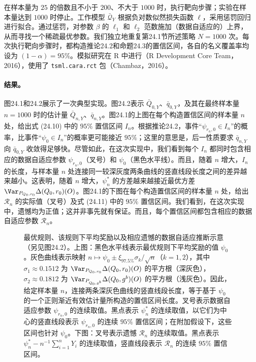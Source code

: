 在样本量为 $25$ 的倍数且不小于 $200$、不大于 $1000$ 时，执行靶向步骤；实验在样本量达到 $1000$ 时停止。工作模型 $\bar{\mathcal Q}_Y$ 根据负对数似然损失函数 $\ell$，采用惩罚回归进行拟合。通过惩罚，对参数 $\beta$ 的 $\ell_1$ 和 $\ell_2$ 范数施加（数据自适应的）上界，从而寻找一个稀疏最优参数。我们独立地重复第24.1节所述策略 $N=1000$ 次。每次执行靶向步骤时，都构造推论24.2和命题24.3的置信区间，各自的名义覆盖率均设为 $(1-\alpha)=95\%$。模拟研究在 R 中进行（R Development Core Team，2016），使用了 \texttt{tsml.cara.rct} 包（Chambaz，2016）。

\paragraph*{结果。}
图24.1和24.2展示了一次典型实现。图24.2表示 $\bar Q_{0,Y}$、$\bar q_{0,Y}$，及其在最终样本量 $n=1000$ 时的估计量 $\bar Q_{n,Y}$、$\bar q_{n,Y}$。图24.1的上图在每个构造置信区间的样本量 $n$ 处，给出式 (24.10) 中的 $95\%$ 置信区间 $I_n$。根据推论24.2，事件“$\psi_{r_n,0}\in I_n$”的概率，比事件“$\psi_0\in I_n$”的概率更可能接近 $95\%$；这里的意思是，后一性质要求 $\bar q_{n,Y}$ 向 $\bar q_{0,Y}$ 收敛得足够快。尽管如此，在这次实现中，我们看到每个 $I_n$ 都同时包含相应的数据自适应参数 $\psi_{r_n,0}$（叉号）和 $\psi_0$（黑色水平线）。而且，随着 $n$ 增大，$I_n$ 的长度，与样本量 $n$ 处连接同一较深灰度两条曲线的竖直线段长度之间的差异越来越小。这表明，随着 $n$ 增大，$\psi_n^*$ 的方差越来越接近最优方差 $\Var_{P_{Q_0,r_0}}\Delta(Q_0,r_0)(O)$。图24.1的下图在每个构造置信区间的样本量 $n$ 处，给出 $\mathcal R_n$ 的实际值（叉号）及式 (24.11) 中的 $95\%$ 置信区间。我们看到，在这次实现中，遗憾均为正值；这并非事先就有保证。而且，每个置信区间都包含相应的数据自适应参数 $\mathcal R_n$。

\begin{figure}[p]
 \centering
 
 \caption{最优规则、该规则下平均奖励以及相应遗憾的数据自适应推断示意（另见图24.2）。上图：黑色水平线表示最优规则下平均奖励的值 $\psi_0$。灰色曲线表示映射 $n\mapsto\psi_0\pm\xi_{97.5\%}\sigma_k/\sqrt n$（$k=1,2$），其中 $\sigma_1\approx0.1512$ 为 $\Var_{P_{Q_0,r_0}}\Delta(Q_0,r_0)(O)$ 的平方根（深灰色），$\sigma_2\approx0.1812$ 为 $\Var_{P_{Q_0,g^b}}\Delta(Q_0,g^b)(O)$ 的平方根（浅灰色）。因此，给定样本量 $n$，连接两条深灰色曲线的竖直线段长度，等于基于 $\psi_0$ 的一个正则渐近有效估计量所构造的置信区间长度。叉号表示数据自适应参数 $\psi_{r_n,0}$ 的连续取值。黑点表示 $\psi_n^*$ 的连续取值，以它们为中心的竖直线段表示 $\psi_{r_n,0}$ 的连续 $95\%$ 置信区间；在附加假设下，这些区间也针对 $\psi_0$。下图：叉号表示遗憾 $\mathcal R_n$ 的连续取值。黑点表示 $\psi_n^*-n^{-1}\sum_{i=1}^nY_i$ 的连续取值，竖直线段表示 $\mathcal R_n$ 的连续 $95\%$ 置信区间。}
 \label{fig:ch24-reward-regret}
\end{figure}


